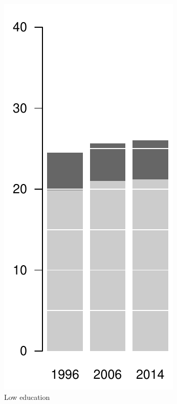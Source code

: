 \begin{figure}[ht!]
\begin{subfigure}[b]{0.2\textwidth}
        \includegraphics[scale=.5]{Figures/bar_male_pri.pdf}
        \caption{Low education}
    \end{subfigure}
    ~ %
    \begin{subfigure}[b]{0.2\textwidth}

\end{subfigure}
\end{figure}
